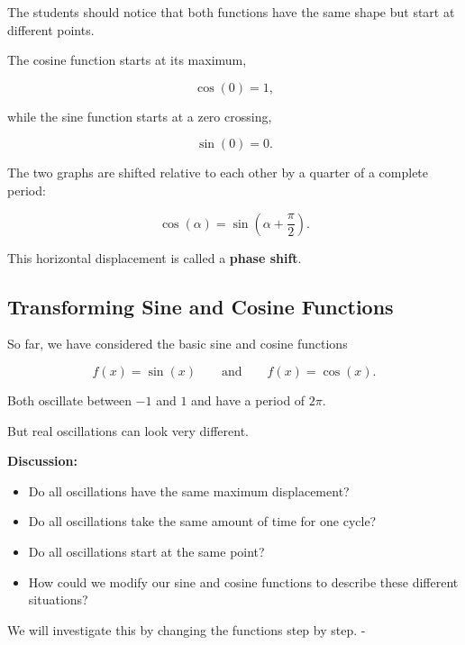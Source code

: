 \documentclass[a4paper,11pt]{article}
\begin{document}
The students should notice that both functions have the same shape but
start at different points.

The cosine function starts at its maximum,

\begin{equation}
    \cos(0)=1,
\end{equation}


while the sine function starts at a zero crossing,

\begin{equation}
    \sin(0)=0.
\end{equation}

The two graphs are shifted relative to each other by a quarter of a
complete period:

\begin{equation}
    \boxed{
    \cos(\alpha)
    =
    \sin\left(\alpha+\frac{\pi}{2}\right)
    }.
\end{equation}

This horizontal displacement is called a \textbf{phase shift}.

\subsection*{Transforming Sine and Cosine Functions}

So far, we have considered the basic sine and cosine functions

\begin{equation}
    f(x)=\sin(x)
    \qquad \text{and} \qquad
    f(x)=\cos(x).
\end{equation}

Both oscillate between $-1$ and $1$ and have a period of $2\pi$.

But real oscillations can look very different.

\textbf{Discussion:}

\begin{itemize}
    \item Do all oscillations have the same maximum displacement?
    \item Do all oscillations take the same amount of time for one cycle?
    \item Do all oscillations start at the same point?
    \item How could we modify our sine and cosine functions to describe
    these different situations?
\end{itemize}

We will investigate this by changing the functions step by step.
-
\end{document}
